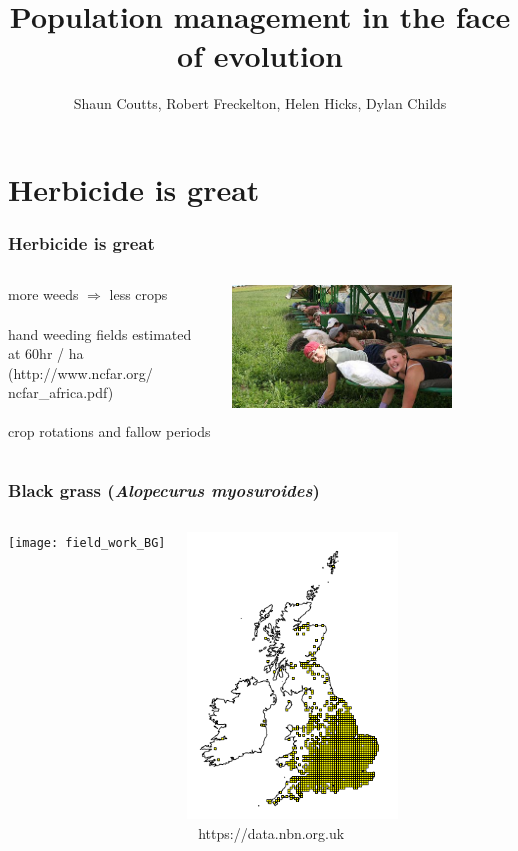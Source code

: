 \documentclass[]{beamer}
\title{Population management in the face of evolution}
\author{Shaun Coutts, Robert Freckelton, Helen Hicks, Dylan Childs}
\institute{University of Sheffield, UK}      %
\begin{document}
\begin{frame}
  \titlepage
\end{frame}

\section{Herbicide is great}
\begin{frame}
	\frametitle{Herbicide is great}
	\begin{columns}[c]
		\column{2.4in}
		more weeds $\Rightarrow$ less crops
		\\~\\
		hand weeding fields estimated \\ at 60hr / ha \\(http://www.ncfar.org/\\
		ncfar\_africa.pdf)
		\\~\\
		crop rotations and fallow periods

		\column{2.5in}
		\includegraphics[width=2.3in]{hand_weeding}	
	\end{columns}	
\end{frame}

\begin{frame}
	\frametitle{Black grass (\textit{Alopecurus myosuroides})}
	\begin{columns}[c]	
		\column{2.5in}
			\texttt{[image: field\_work\_BG]}
	
		\column{2.5in}	
			\includegraphics[width=2.2in]{BG_map.png}
			\\~
			https://data.nbn.org.uk
	\end{columns} 
\end{frame}
\end{document}
